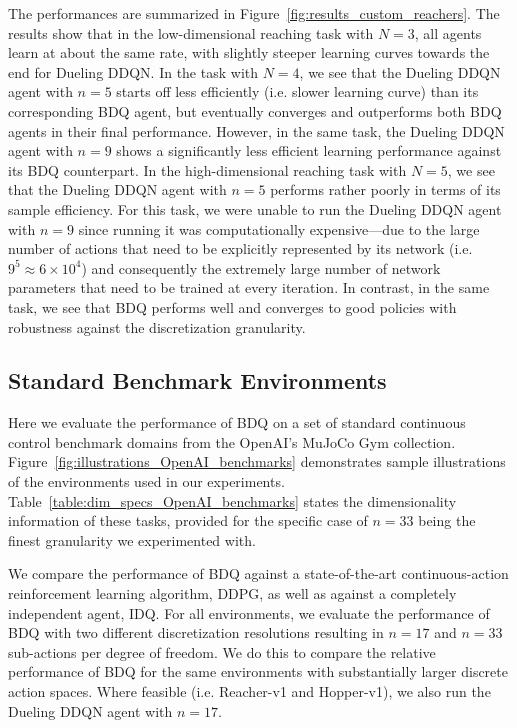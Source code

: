 \documentclass[letterpaper]{article}
\begin{document}
The performances are summarized in Figure~\ref{fig:results_custom_reachers}. The results show that in the low-dimensional reaching task with $N=3$, all agents learn at about the same rate, with slightly steeper learning curves towards the end for Dueling DDQN. In the task with $N=4$, we see that the Dueling DDQN agent with $n=5$ starts off less efficiently (i.e. slower learning curve) than its corresponding BDQ agent, but eventually converges and outperforms both BDQ agents in their final performance. However, in the same task, the Dueling DDQN agent with $n=9$ shows a significantly less efficient learning performance against its BDQ counterpart. In the high-dimensional reaching task with $N=5$, we see that the Dueling DDQN agent with $n=5$ performs rather poorly in terms of its sample efficiency. For this task, we were unable to run the Dueling DDQN agent with $n=9$ since running it was computationally expensive---due to the large number of actions that need to be explicitly represented by its network (i.e. $9^5 \approx 6 \times 10^4$) and consequently the extremely large number of network parameters that need to be trained at every iteration. In contrast, in the same task, we see that BDQ performs well and converges to good policies with robustness against the discretization granularity.


\subsection{Standard Benchmark Environments}
\label{sec:experiments_openai}

Here we evaluate the performance of BDQ on a set of standard continuous control benchmark domains from the OpenAI's MuJoCo Gym collection. Figure~\ref{fig:illustrations_OpenAI_benchmarks} demonstrates sample illustrations of the environments used in our experiments. Table~\ref{table:dim_specs_OpenAI_benchmarks} states the dimensionality information of these tasks, provided for the specific case of $n=33$ being the finest granularity we experimented with.

We compare the performance of BDQ against a state-of-the-art continuous-action reinforcement learning algorithm, DDPG, as well as against a completely independent agent, IDQ. For all environments, we evaluate the performance of BDQ with two different discretization resolutions resulting in $n=17$ and $n=33$ sub-actions per degree of freedom. We do this to compare the relative performance of BDQ for the same environments with substantially larger discrete action spaces. Where feasible (i.e. Reacher-v1 and Hopper-v1), we also run the Dueling DDQN agent with $n=17$.
\end{document}
